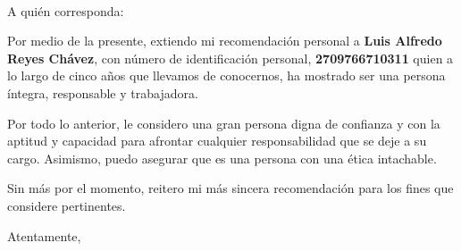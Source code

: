 \documentclass[12pt,letterpaper]{letter}
\date{Guatemala, 26 de septiembre de 2022}
\begin{document}
\begin{letter}{
\\
}

\opening{A quién corresponda:}

Por medio de la presente, extiendo mi recomendación personal a \textbf{Luis Alfredo Reyes Chávez}, con número de identificación personal, \textbf{2709766710311} quien a lo largo de cinco años que llevamos de conocernos, ha mostrado ser una persona íntegra, responsable y trabajadora.

Por todo lo anterior, le considero una gran persona digna de confianza y con la aptitud y capacidad para afrontar cualquier responsabilidad que se deje a su cargo. Asimismo, puedo asegurar que es una persona con una ética intachable.

Sin más por el momento, reitero mi más sincera recomendación para los fines que considere pertinentes.

\closing{
Atentamente,
}

\end{letter}
\end{document}
